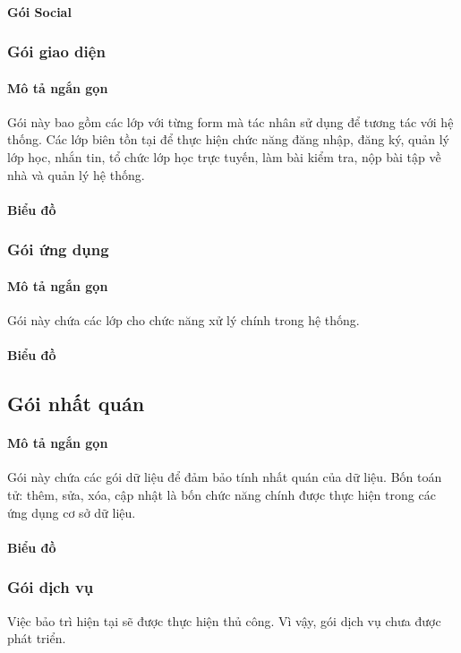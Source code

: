 \documentclass[./../main_file.tex]{subfiles}
\begin{document}
	\paragraph{Gói Social}
	
	\subsubsection{Gói giao diện}
	\paragraph{Mô tả ngắn gọn}
	Gói này bao gồm các lớp với từng form mà tác nhân sử dụng để tương tác với hệ thống. Các lớp biên tồn tại để thực hiện chức năng đăng nhập, đăng ký, quản lý lớp học, nhắn tin, tổ chức lớp học trực tuyến, làm bài kiểm tra, nộp bài tập về nhà và quản lý hệ thống.
	\paragraph{Biểu đồ}
	\subsubsection{Gói ứng dụng}
	\paragraph{Mô tả ngắn gọn}
	Gói này chứa các lớp cho chức năng xử lý chính trong hệ thống.
	\paragraph{Biểu đồ}
	\subsection{Gói nhất quán}
	\paragraph{Mô tả ngắn gọn}
	Gói này chứa các gói dữ liệu để đảm bảo tính nhất quán của dữ liệu. Bốn toán tử: thêm, sửa, xóa, cập nhật là bốn chức năng chính được thực hiện trong các ứng dụng cơ sở dữ liệu.
	\paragraph{Biểu đồ}
	\subsubsection{Gói dịch vụ}
	Việc bảo trì hiện tại sẽ được thực hiện thủ công. Vì vậy, gói dịch vụ chưa được phát triển.
	
	
	
\end{document}
